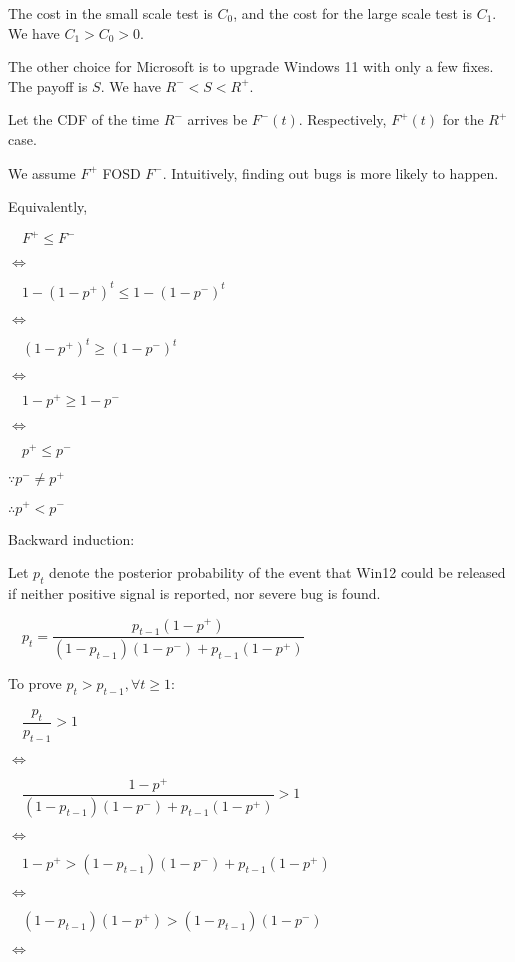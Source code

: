 \documentclass{article}
\begin{document}
The cost in the small scale test is $C_{0}$, and the cost for the large scale test is $C_{1}$. We have $C_{1}>C_{0}>0$.

The other choice for Microsoft is to upgrade Windows 11 with only a few fixes. The payoff is $S$. We have $R^{-}<S<R^{+}$.

Let the CDF of the time $R^{-}$ arrives be $F^{-}\left(t\right)$. Respectively, $F^{+}\left(t\right)$ for the $R^{+}$ case. 

We assume $F^{+}$ FOSD $F^{-}$. Intuitively, finding out bugs is more likely to happen. 

Equivalently,

$\quad F^{+}\leqslant F^{-}$

$\iff$

$\quad 1-\left(1-p^{+}\right)^{t}\leqslant1-\left(1-p^{-}\right)^{t}$

$\iff$

$\quad \left(1-p^{+}\right)^{t}\geqslant\left(1-p^{-}\right)^{t}$

$\iff$

$\quad 1-p^{+}\geqslant1-p^{-}$

$\iff$

$\quad p^{+}\leqslant p^{-}$

$\because p^{-}\neq p^{+}$

$\therefore p^{+}<p^{-}$

Backward induction:

Let $p_{t}$ denote the posterior probability of the event that Win12 could be released if neither positive signal is reported, nor severe bug is found. 

$ \quad p_{t}=\dfrac{p_{t-1}\left(1-p^{+}\right)}{\left(1-p_{t-1}\right)\left(1-p^{-}\right)+p_{t-1}\left(1-p^{+}\right)}$

To prove $p_{t}>p_{t-1}, \forall t\geqslant1$:

$\quad \dfrac{p_{t}}{p_{t-1}}>1$

$\iff$

$ \quad \dfrac{1-p^{+}}{\left(1-p_{t-1}\right)\left(1-p^{-}\right)+p_{t-1}\left(1-p^{+}\right)}>1$

$\iff$

$\quad 1-p^{+}>\left(1-p_{t-1}\right)\left(1-p^{-}\right)+p_{t-1}\left(1-p^{+}\right)$

$\iff$

$\quad \left(1-p_{t-1}\right)\left(1-p^{+}\right)>\left(1-p_{t-1}\right)\left(1-p^{-}\right)$

$\iff$
\end{document}
